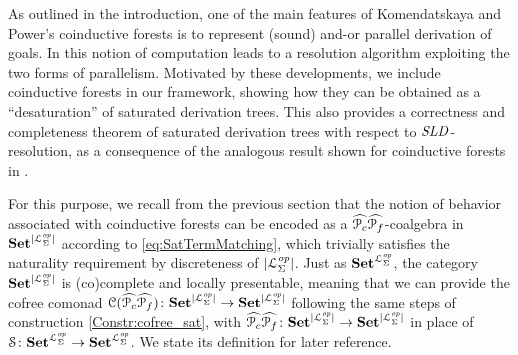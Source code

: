 As outlined in the introduction, one of the main features of Komendatskaya and Power's coinductive forests is to represent (sound) and-or parallel derivation of goals. In \cite{KomPowerCSL11} this notion of computation leads to a resolution algorithm exploiting the two forms of parallelism.
Motivated by these developments, we include coinductive forests in our framework, showing how they can be obtained as a ``desaturation'' of saturated derivation trees. This also provides a correctness and completeness theorem of saturated derivation trees with respect to $\mathit{SLD}$-resolution, as a consequence of the analogous result shown for coinductive forests in \cite[Th.4.8]{KomPowerCSL11}.

For this purpose, we recall from the previous section that the notion of behavior associated with coinductive forests can be encoded as a $\widehat{\mathcal P _c}\widehat{\mathcal P _f}$-coalgebra in $\mathbf{Set}^{|\mathcal{L}^{\mathit{op}}_{\Sigma}|}$ according to \eqref{eq:SatTermMatching}, which trivially satisfies the naturality requirement by discreteness of $|\mathcal{L}^{\mathit{op}}_{\Sigma}|$. Just as $\mathbf{Set}^{\mathcal{L}^{\mathit{op}}_{\Sigma}}$, the category $\mathbf{Set}^{|\mathcal{L}^{\mathit{op}}_{\Sigma}|}$ is (co)complete and locally presentable, meaning that we can provide the cofree comonad $\mathcal{C}(\widehat{\mathcal P _c}\widehat{\mathcal P _f})\colon \mathbf{Set}^{|\mathcal{L}^{\mathit{op}}_{\Sigma}|} \to \mathbf{Set}^{|\mathcal{L}^{\mathit{op}}_{\Sigma}|}$ following the same steps of construction \ref{Constr:cofree_sat}, with $\widehat{\mathcal P _c}\widehat{\mathcal P _f}  \colon \mathbf{Set}^{|\mathcal{L}^{\mathit{op}}_{\Sigma}|} \to \mathbf{Set}^{|\mathcal{L}^{\mathit{op}}_{\Sigma}|}$ in place of $\mathcal{S} \colon \mathbf{Set}^{\mathcal{L}^{\mathit{op}}_{\Sigma}} \to \mathbf{Set}^{\mathcal{L}^{\mathit{op}}_{\Sigma}}$. We state its definition for later reference.
